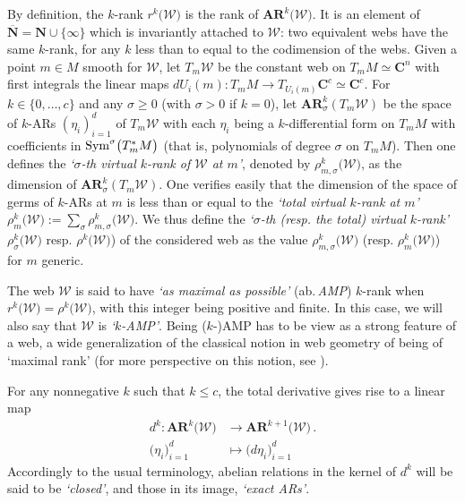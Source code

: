 \documentclass[11pt]{amsart}
\newcommand{\mk}{\medskip}
\begin{document}
By definition, the $k$-rank $r^k\big( \boldsymbol{\mathcal W} \big)$ is the rank of 
$\boldsymbol{AR}^k\big(\boldsymbol{\mathcal W} \big)$. It is an element of $\overline{\mathbf N}=\mathbf N\cup \{ \infty\}$ which is invariantly attached to $\boldsymbol{\mathcal W}$: two equivalent webs have the same $k$-rank, for any $k$ less than to equal to the codimension of the webs. Given a point $m\in M$ smooth for $\boldsymbol{\mathcal W}$, let $T_m \boldsymbol{\mathcal W}$ be the constant web on $T_m M\simeq \mathbf C^n$ with first integrals the linear maps 
$dU_i(m): T_m M\rightarrow T_{U_i(m)} \mathbf C^c\simeq \mathbf C^c$. 
For $k\in \{0,\ldots,c\}$ and any $\sigma\geq 0$ (with $\sigma>0$ if $k=0$), let $\boldsymbol{AR}^k_\sigma(T_m \boldsymbol{\mathcal W})$ be the space of $k$-ARs $(\eta_i)_{i=1}^d$ 
of $T_m \boldsymbol{\mathcal W}$ with each $\eta_i$ being a $k$-differential form 
on $T_m M$ with coefficients in ${\rm Sym}^\sigma\big( T_m^* M\big)$ (that is, polynomials of degree $\sigma$ on $T_m M$).  Then one defines the {\it `$\sigma$-th virtual $k$-rank of $\boldsymbol{\mathcal W}$ at $m$'}, denoted by 
$\rho^k_{m,\sigma}\big(\boldsymbol{\mathcal W}\big)$, as the dimension of 
$\boldsymbol{AR}^k_\sigma(T_m \boldsymbol{\mathcal W})$.  
One verifies easily that the dimension of the space of germs of $k$-ARs at $m$ is less than or equal to the {\it `total virtual $k$-rank at $m$'} $\rho^k_m\big( 
\boldsymbol{\mathcal W}\big):= \sum_{\sigma} \rho^k_{m,\sigma}\big(\boldsymbol{\mathcal W}\big)$.  We thus define the {\it `$\sigma$-th (resp. the total) virtual $k$-rank'} 
 $\rho^k_{\sigma}\big(\boldsymbol{\mathcal W}\big)$ resp. 
$\rho^k\big(  \boldsymbol{\mathcal W}\big)$) of the considered web as the value 
$\rho^k_{m,\sigma}\big(\boldsymbol{\mathcal W}\big)$ (resp.  $\rho^k_m\big( 
\boldsymbol{\mathcal W}\big)$) for $m$ generic. 

The web $\boldsymbol{\mathcal W}$ is said to have {\it `as maximal as possible'} (ab.\,{\it AMP}) $k$-rank when $r^k\big( \boldsymbol{\mathcal W} \big)=\rho^k\big( \boldsymbol{\mathcal W} \big)$, with this integer being positive and finite.  In this case, we will also say that $\boldsymbol{\mathcal W}$ is {\it `$k$-AMP'}. Being ($k$-)AMP has to be view as a strong feature of a web, a wide generalization of the classical notion in web geometry of being of `maximal rank' (for more perspective on this notion, see \cite[\S1.3]{ClusterWebs}). 
\mk 

For any nonnegative $k$ such that $k\leq c$, the total derivative gives rise to a linear map 
\begin{align}
\label{Eq:derivative-d1}
d^k:  
\boldsymbol{AR}^k\big(\boldsymbol{\mathcal W}\big) & \longrightarrow 
\boldsymbol{AR}^{k+1}\big(\boldsymbol{\mathcal W}\big)\, . \\
 \big( \eta_i \big)_{i=1}^{d}
& \longmapsto  \big( d\eta_i \big)_{i=1}^{d}
\nonumber 
\end{align}
Accordingly to the usual terminology, abelian relations in the kernel of $d^k$ will be said to be {\it `closed'}, and those in its image, {\it `exact ARs'}. 
\end{document}
